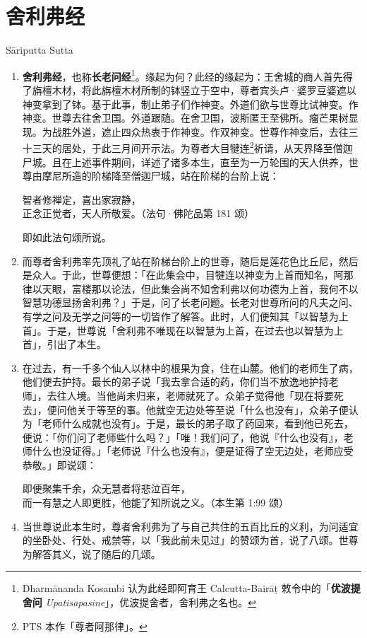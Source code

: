 \section{舍利弗经}

\begin{center}Sāriputta Sutta\end{center}\vspace{1em}

\begin{enumerate}\item \textbf{舍利弗经}，也称\textbf{长老问经}\footnote{Dharmānanda Kosambi 认为此经即阿育王 Calcutta-Bairāṭ 敕令中的「\textbf{优波提舍问} \textit{Upatisapasine}」，优波提舍者，舍利弗之名也。}。缘起为何？此经的缘起为：王舍城的商人首先得了旃檀木材，将此旃檀木材所制的钵竖立于空中，尊者宾头卢·婆罗豆婆遮以神变拿到了钵。基于此事，制止弟子们作神变。外道们欲与世尊比试神变。作神变。世尊去往舍卫国。外道跟随。在舍卫国，波斯匿王至佛所。瘤芒果树显现。为战胜外道，遮止四众热衷于作神变。作双神变。世尊作神变后，去往三十三天的居处，于此三月间开示法。为尊者大目犍连\footnote{PTS 本作「尊者阿那律」。}祈请，从天界降至僧迦尸城。且在上述事件期间，详述了诸多本生，直至为一万轮围的天人供养，世尊由摩尼所造的阶梯降至僧迦尸城，站在阶梯的台阶上说：\begin{quoting}智者修禅定，喜出家寂静，\\正念正觉者，天人所敬爱。（法句·佛陀品第 181 颂）\end{quoting}即如此法句颂所说。
\item 而尊者舍利弗率先顶礼了站在阶梯台阶上的世尊，随后是莲花色比丘尼，然后是众人。于此，世尊便想：「在此集会中，目犍连以神变为上首而知名，阿那律以天眼，富楼那以论法，但此集会尚不知舍利弗以何功德为上首，我何不以智慧功德显扬舍利弗？」于是，问了长老问题。长老对世尊所问的凡夫之问、有学之问及无学之问等的一切皆作了解答。此时，人们便知其「以智慧为上首」。于是，世尊说「舍利弗不唯现在以智慧为上首，在过去也以智慧为上首」，引出了本生。
\item 在过去，有一千多个仙人以林中的根果为食，住在山麓。他们的老师生了病，他们便去护持。最长的弟子说「我去拿合适的药，你们当不放逸地护持老师」，去往人境。当他尚未归来，老师就死了。众弟子觉得他「现在将要死去」，便问他关于等至的事。他就空无边处等至说「什么也没有」，众弟子便认为「老师什么成就也没有」。于是，最长的弟子取了药回来，看到他已死去，便说：「你们问了老师些什么吗？」「唯！我们问了，他说『什么也没有』，老师什么也没证得。」「老师说『什么也没有』，便是证得了空无边处，老师应受恭敬。」即说颂：\begin{quoting}即便聚集千余，众无慧者将悲泣百年，\\而一有慧之人即更胜，他能了知所说之义。（本生第 1:99 颂）\end{quoting}
\item 当世尊说此本生时，尊者舍利弗为了与自己共住的五百比丘的义利，为问适宜的坐卧处、行处、戒禁等，以「我此前未见过」的赞颂为首，说了八颂。世尊为解答其义，说了随后的几颂。\end{enumerate}

